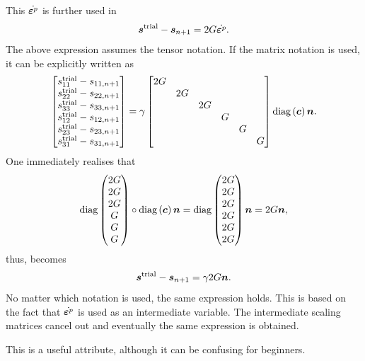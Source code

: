This $\dot{\bm{\varepsilon}^p}$ is further used in
\begin{gather}\label{eq:j2_two_form}
    \bm{s}^\text{trial}-\bm{s}_{n+1}=2G\dot{\bm{\varepsilon}^p}.
\end{gather}
The above expression assumes the tensor notation.
If the matrix notation is used, it can be explicitly written as
\begin{gather}
    \begin{bmatrix}
        s^\text{trial}_{11}-s_{11,n+1} \\
        s^\text{trial}_{22}-s_{22,n+1} \\
        s^\text{trial}_{33}-s_{33,n+1} \\
        s^\text{trial}_{12}-s_{12,n+1} \\
        s^\text{trial}_{23}-s_{23,n+1} \\
        s^\text{trial}_{31}-s_{31,n+1}
    \end{bmatrix}=\gamma\begin{bmatrix}
        2G &    &    &   &   &   \\
           & 2G &    &   &   &   \\
           &    & 2G &   &   &   \\
           &    &    & G &   &   \\
           &    &    &   & G &   \\
           &    &    &   &   & G
    \end{bmatrix}\text{diag}\left(\bm{c}\right)\bm{n}.
\end{gather}
One immediately realises that
\begin{gather}
    \text{diag}\left(\begin{matrix}
            2G \\2G\\2G\\G\\G\\G
        \end{matrix}\right)\circ\text{diag}\left(\bm{c}\right)\bm{n}=\text{diag}\left(\begin{matrix}
            2G \\2G\\2G\\2G\\2G\\2G
        \end{matrix}\right)\bm{n}=2G\bm{n},
\end{gather}
thus,  becomes
\begin{gather}
    \bm{s}^\text{trial}-\bm{s}_{n+1}=\gamma2G\bm{n}.
\end{gather}
No matter which notation is used, the same expression holds.
This is based on the fact that $\dot{\bm{\varepsilon}^p}$ is used as an intermediate variable.
The intermediate scaling matrices cancel out and eventually the same expression is obtained.

This is a useful attribute, although it can be confusing for beginners.
